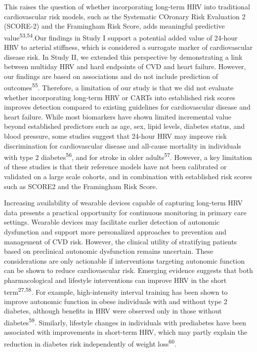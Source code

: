 \documentclass[
  a4paper,
  headsepline=true,
  open=any]{scrbook}
\begin{document}
This raises the question of whether incorporating long-term HRV into
traditional cardiovascular risk models, such as the Systematic COronary
Risk Evaluation 2 (SCORE-2) and the Framingham Risk Score, adds
meaningful predictive value\textsuperscript{53,54}.Our findings in Study
I support a potential added value of 24-hour HRV to arterial stiffness,
which is considered a surrogate marker of cardiovascular disease risk.
In Study II, we extended this perspective by demonstrating a link
between multiday HRV and hard endpoints of CVD and heart failure.
However, our findings are based on associations and do not include
prediction of outcomes\textsuperscript{55}. Therefore, a limitation of
our study is that we did not evaluate whether incorporating long-term
HRV or CARTs into established risk scores improves detection compared to
existing guidelines for cardiovascular disease and heart failure. While
most biomarkers have shown limited incremental value beyond established
predictors such as age, sex, lipid levels, diabetes status, and blood
pressure, some studies suggest that 24-hour HRV may improve risk
discrimination for cardiovascular disease and all-cause mortality in
individuals with type 2 diabetes\textsuperscript{56}, and for stroke in
older adults\textsuperscript{57}. However, a key limitation of these
studies is that their reference models have not been calibrated or
validated on a large scale cohorts, and in combination with established
risk scores such as SCORE2 and the Framingham Risk Score.

Increasing availability of wearable devices capable of capturing
long-term HRV data presents a practical opportunity for continuous
monitoring in primary care settings. Wearable devices may facilitate
earlier detection of autonomic dysfunction and support more personalized
approaches to prevention and management of CVD risk. However, the
clinical utility of stratifying patients based on preclinical autonomic
dysfunction remains uncertain. These considerations are only actionable
if interventions targeting autonomic function can be shown to reduce
cardiovascular risk. Emerging evidence suggests that both
pharmacological and lifestyle interventions can improve HRV in the short
term\textsuperscript{27,58}. For example, high-intensity interval
training has been shown to improve autonomic function in obese
individuals with and without type 2 diabetes, although benefits in HRV
were observed only in those without diabetes\textsuperscript{59}.
Similarly, lifestyle changes in individuals with prediabetes have been
associated with improvements in short-term HRV, which may partly explain
the reduction in diabetes risk independently of weight
loss\textsuperscript{60}.
\end{document}
